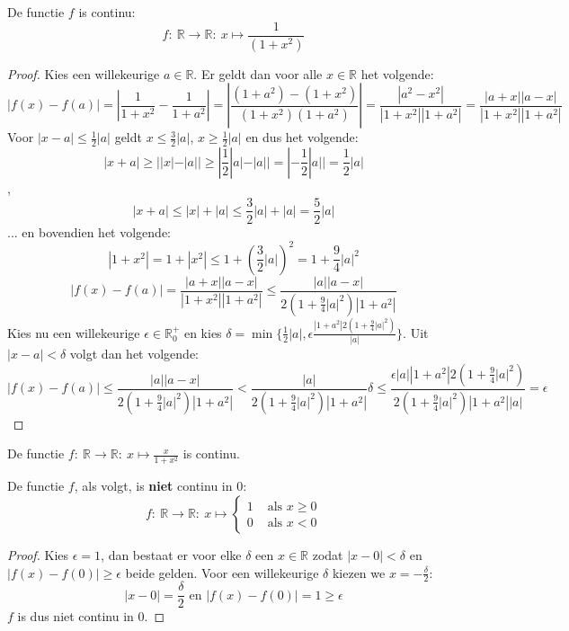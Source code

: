 \documentclass[main.tex]{subfiles}
\begin{document}
\begin{vb}
  De functie $f$ is continu:
  \[ f:\ \mathbb{R} \rightarrow \mathbb{R}:\ x \mapsto \frac{1}{(1+x^{2})} \]

  \begin{proof}
    Kies een willekeurige $a\in \mathbb{R}$.
    Er geldt dan voor alle $x \in \mathbb{R}$ het volgende:
    \[
    |f(x)-f(a)|
    = \left| \frac{1}{1+x^{2}} - \frac{1}{1+a^{2}}\right|
    = \left| \frac{(1+a^{2})-(1+x^{2})}{(1+x^{2})(1+a^{2})}\right|
    = \frac{|a^{2}-x^{2}|}{|1+x^{2}||1+a^{2}|}
    = \frac{|a+x||a-x|}{|1+x^{2}||1+a^{2}|}
    \]
    Voor $|x-a| \le \frac{1}{2}|a|$ geldt $x \le \frac{3}{2}|a|$, $x \ge \frac{1}{2}|a|$ en dus het volgende:
    \[ |x+a| \ge ||x|-|a|| \ge |\frac{1}{2}|a| - |a|| = |-\frac{1}{2}|a|| = \frac{1}{2}|a| \]
    ,
    \[ |x+a| \le |x|+|a| \le \frac{3}{2}|a| + |a| = \frac{5}{2}|a| \]
    ... en bovendien het volgende:
    \[ |1+x^{2}| = 1 + |x^{2}| \le 1 + \left(\frac{3}{2}|a|\right)^{2} = 1 + \frac{9}{4}|a|^{2} \]
    \[
    |f(x)-f(a)|
    = \frac{|a+x||a-x|}{|1+x^{2}||1+a^{2}|}
    \le \frac{|a||a-x|}{2\left(1 + \frac{9}{4}|a|^{2}\right)|1+a^{2}|}
    \]
    Kies nu een willekeurige $\epsilon \in \mathbb{R}_{0}^{+}$ en kies $\delta = \min\{\frac{1}{2}|a|,\epsilon\frac{|1+a^{2}|2\left(1 + \frac{9}{4}|a|^{2}\right)}{|a|} \}$.
    Uit $|x-a| < \delta$ volgt dan het volgende:
    \[ 
    |f(x)-f(a)|
    \le \frac{|a||a-x|}{2\left(1 + \frac{9}{4}|a|^{2}\right)|1+a^{2}|}
    < \frac{|a|}{2\left(1 + \frac{9}{4}|a|^{2}\right)|1+a^{2}|}\delta
    \le \frac{\epsilon|a||1+a^{2}|2\left(1 + \frac{9}{4}|a|^{2}\right)}{2\left(1 + \frac{9}{4}|a|^{2}\right)|1+a^{2}||a|} = \epsilon
    \]
  \end{proof}
\feed
\end{vb}

\begin{vb}
  De functie $f:\ \mathbb{R} \rightarrow \mathbb{R}:\ x \mapsto \frac{x}{1+x^{2}}$ is continu.

\end{vb}

\begin{tvb}
  De functie $f$, als volgt, is \textbf{niet} continu in $0$:
  \[
  f:\ \mathbb{R} \rightarrow \mathbb{R}:\ x\mapsto 
  \left\{
    \begin{array}{cl}
      1 & \text{ als } x \ge 0\\
      0 & \text{ als } x < 0
    \end{array}
  \right.
  \]

  \begin{proof}
    Kies $\epsilon = 1$, dan bestaat er voor elke $\delta$ een $x\in \mathbb{R}$ zodat $|x-0|<\delta$ en $|f(x)-f(0)|\ge \epsilon$ beide gelden.
    Voor een willekeurige $\delta$ kiezen we $x = -\frac{\delta}{2}$:
    \[ |x-0| = \frac{\delta}{2} \text{ en } |f(x)-f(0)| = 1 \ge \epsilon \]
    $f$ is dus niet continu in $0$.
  \end{proof}
\end{tvb}
\end{document}
